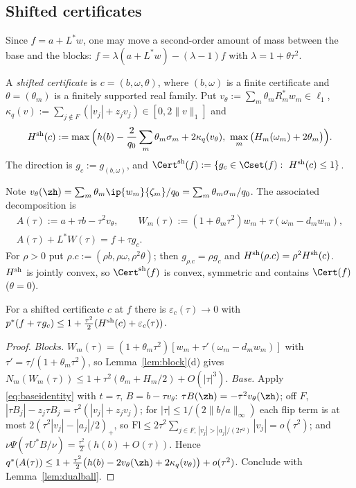 \subsection{Shifted certificates}
Since $f=a+L^*w$, one may move a second-order amount of mass between the
base and the blocks: $f=\lambda(a+L^*w)-(\lambda-1)f$ with
$\lambda=1+\theta\tau^2$.

\begin{definition}\label{def:shifted}
A \emph{shifted certificate} is $c=(b,\omega,\theta)$, where $(b,\omega)$ is
a finite certificate and $\theta=(\theta_m)$ is a finitely supported real
family.  Put $v_\theta:=\sum_m\theta_mR_m^*w_m\in\ell_1$,
$\kappa_q(v):=\sum_{j\notin F}(|v_j|+z_jv_j)\in[0,2\|v\|_1]$ and
\[
 H^{\rm sh}(c):=\max\Big(h(b)-\frac2{q_0}\sum_m\theta_m\sigma_m
 +2\kappa_q(v_\theta),\ \max_m\big(H_m(\omega_m)+2\theta_m\big)\Big).
\]
The direction is $g_c:=g_{(b,\omega)}$, and
$\Cert^{\rm sh}(f):=\{g_c\in\Cset(f):\ H^{\rm sh}(c)\le1\}$.
\end{definition}

Note $v_\theta(\zh)=\sum_m\theta_m\ip{w_m}{\zeta_m}/q_0=\sum_m\theta_m
\sigma_m/q_0$.  The associated decomposition is
\begin{equation}\label{eq:shiftdec}
 \begin{gathered}
 A(\tau):=a+\tau b-\tau^2v_\theta,\qquad W_m(\tau):=(1+\theta_m\tau^2)w_m+
 \tau(\omega_m-d_mw_m),\\
 A(\tau)+L^*W(\tau)=f+\tau g_c.
 \end{gathered}
\end{equation}
For $\rho>0$ put $\rho.c:=(\rho b,\rho\omega,\rho^2\theta)$; then
$g_{\rho.c}=\rho g_c$ and $H^{\rm sh}(\rho.c)=\rho^2H^{\rm sh}(c)$.
$H^{\rm sh}$ is jointly convex, so $\Cert^{\rm sh}(f)$ is convex,
symmetric and contains $\Cert(f)$ ($\theta=0$).

\begin{proposition}\label{prop:shifted}
For a shifted certificate $c$ at $f$ there is $\varepsilon_c(\tau)\to0$ with
$p^*(f+\tau g_c)\le1+\frac{\tau^2}2(H^{\rm sh}(c)+\varepsilon_c(\tau))$.
\end{proposition}

\begin{proof}
\emph{Blocks.} $W_m(\tau)=(1+\theta_m\tau^2)[w_m+\tau'(\omega_m-d_mw_m)]$
with $\tau'=\tau/(1+\theta_m\tau^2)$, so Lemma~\ref{lem:block}(d) gives
$N_m(W_m(\tau))\le1+\tau^2(\theta_m+H_m/2)+O(|\tau|^3)$.
\emph{Base.} Apply \eqref{eq:baseidentity} with $t=\tau$,
$B=b-\tau v_\theta$: $\tau B(\zh)=-\tau^2v_\theta(\zh)$; off $F$,
$|\tau B_j|-z_j\tau B_j=\tau^2(|v_j|+z_jv_j)$; for $|\tau|\le
1/(2\|b/a\|_\infty)$ each flip term is at most
$2(\tau^2|v_j|-|a_j|/2)_+$, so
$\mathrm{Fl}\le2\tau^2\sum_{j\in F,\,|v_j|>|a_j|/(2\tau^2)}|v_j|=o(\tau^2)$;
and $\nu\Psi(\tau U^*B/\nu)=\frac{\tau^2}2(h(b)+O(\tau))$.  Hence
$q^*(A(\tau))\le1+\frac{\tau^2}2\big(h(b)-2v_\theta(\zh)+2\kappa_q(v_\theta)
\big)+o(\tau^2)$.  Conclude with Lemma~\ref{lem:dualball}.
\end{proof}

